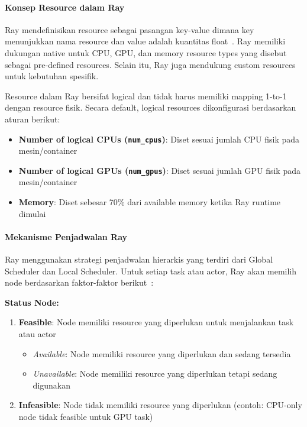 \paragraph{Konsep Resource dalam Ray}

Ray mendefinisikan resource sebagai pasangan key-value dimana key menunjukkan nama resource dan value adalah kuantitas float~\citep{RayResources2024}. Ray memiliki dukungan native untuk CPU, GPU, dan memory resource types yang disebut sebagai pre-defined resources. Selain itu, Ray juga mendukung custom resources untuk kebutuhan spesifik.

Resource dalam Ray bersifat logical dan tidak harus memiliki mapping 1-to-1 dengan resource fisik. Secara default, logical resources dikonfigurasi berdasarkan aturan berikut:
\begin{itemize}
\item \textbf{Number of logical CPUs (\texttt{num\_cpus})}: Diset sesuai jumlah CPU fisik pada mesin/container
\item \textbf{Number of logical GPUs (\texttt{num\_gpus})}: Diset sesuai jumlah GPU fisik pada mesin/container
\item \textbf{Memory}: Diset sebesar 70\% dari available memory ketika Ray runtime dimulai
\end{itemize}

\paragraph{Mekanisme Penjadwalan Ray}

Ray menggunakan strategi penjadwalan hierarkis yang terdiri dari Global Scheduler dan Local Scheduler. Untuk setiap task atau actor, Ray akan memilih node berdasarkan faktor-faktor berikut~\parencite{RayScheduling2024}:

\textbf{Status Node:}
\begin{enumerate}
\item \textbf{Feasible}: Node memiliki resource yang diperlukan untuk menjalankan task atau actor
   \begin{itemize}
   \item \textit{Available}: Node memiliki resource yang diperlukan dan sedang tersedia
   \item \textit{Unavailable}: Node memiliki resource yang diperlukan tetapi sedang digunakan
   \end{itemize}
\item \textbf{Infeasible}: Node tidak memiliki resource yang diperlukan (contoh: CPU-only node tidak feasible untuk GPU task)
\end{enumerate}

